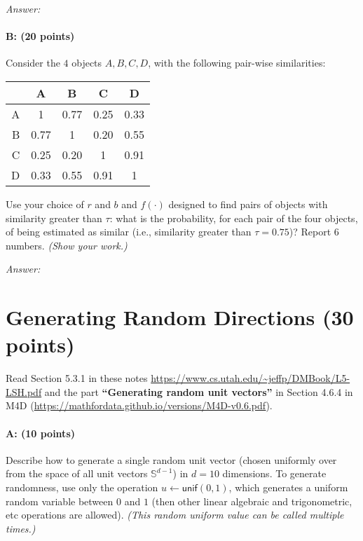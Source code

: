 \documentclass[11pt]{article}
\begin{document}
\emph{Answer:} 

\paragraph{B: (20 points)}
Consider the $4$ objects $A,B,C,D$, with the following pair-wise similarities:
\begin{center}
\begin{tabular}{r||cccc}
& A & B & C & D
\\ \hline
A & 1 & 0.77 & 0.25 & 0.33\\
B & 0.77 & 1 & 0.20 & 0.55 \\
C & 0.25 & 0.20 & 1 & 0.91 \\
D & 0.33 & 0.55 & 0.91 & 1\\
\end{tabular}
\end{center}

Use your choice of $r$ and $b$ and $f(\cdot)$ designed to find pairs of objects with similarity greater than $\tau$:  what is the probability, for each pair of the four objects, of being estimated as similar (i.e., similarity greater than $\tau = 0.75$)?  
Report $6$ numbers.  
\emph{(Show your work.)}


\emph{Answer:} 

\section{Generating Random Directions  (30 points)}

Read Section 5.3.1 in these notes \url{https://www.cs.utah.edu/~jeffp/DMBook/L5-LSH.pdf} and the part \textbf{``Generating random unit vectors''} in Section 4.6.4 in M4D (\url{https://mathfordata.github.io/versions/M4D-v0.6.pdf}).   

\paragraph{A:  (10 points)}
Describe how to generate a single random unit vector (chosen uniformly over from the space of all unit vectors $\mathbb{S}^{d-1}$) in $d=10$ dimensions.  To generate randomness, use only the operation $u \leftarrow \mathsf{unif}(0,1)$, which generates a uniform random variable between $0$ and $1$ (then other linear algebraic and trigonometric, etc operations are allowed).  
\emph{(This random uniform value can be called multiple times.)}
\end{document}
